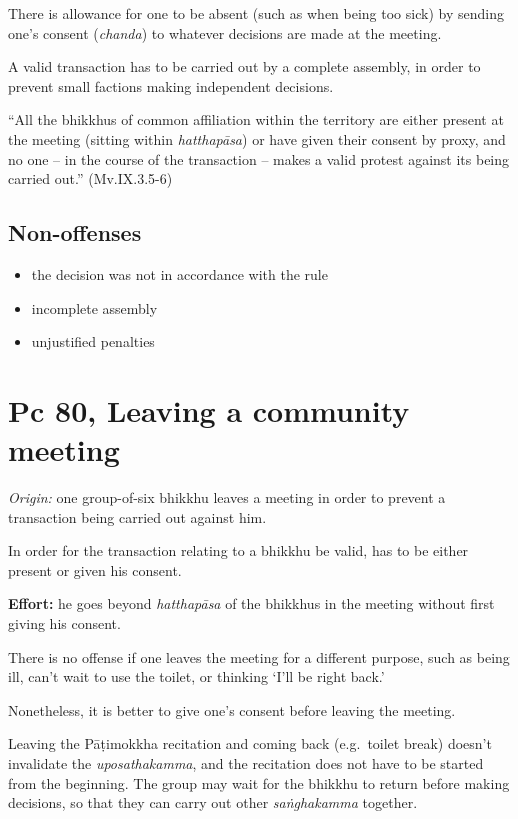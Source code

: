 There is allowance for one to be absent (such as when being too sick) by
sending one's consent (\emph{chanda}) to whatever decisions are made at
the meeting.

A valid transaction has to be carried out by a complete assembly, in
order to prevent small factions making independent decisions.

``All the bhikkhus of common affiliation within the territory are either
present at the meeting (sitting within \emph{hatthapāsa}) or have given
their consent by proxy, and no one -- in the course of the transaction
-- makes a valid protest against its being carried out.'' (Mv.IX.3.5-6)

\subsection{Non-offenses}

\begin{itemize}
\tightlist
\item
  the decision was not in accordance with the rule
\item
  incomplete assembly
\item
  unjustified penalties
\end{itemize}

\section{Pc 80, Leaving a community meeting}

\emph{Origin:} one group-of-six bhikkhu leaves a meeting in order to
prevent a transaction being carried out against him.

In order for the transaction relating to a bhikkhu be valid, has to be
either present or given his consent.

\textbf{Effort:} he goes beyond \emph{hatthapāsa} of the bhikkhus in the
meeting without first giving his consent.

There is no offense if one leaves the meeting for a different purpose,
such as being ill, can't wait to use the toilet, or thinking `I'll be
right back.'

Nonetheless, it is better to give one's consent before leaving the
meeting.

Leaving the Pāṭimokkha recitation and coming back (e.g.~toilet break)
doesn't invalidate the \emph{uposathakamma}, and the recitation does not
have to be started from the beginning. The group may wait for the
bhikkhu to return before making decisions, so that they can carry out
other \emph{saṅghakamma} together.

